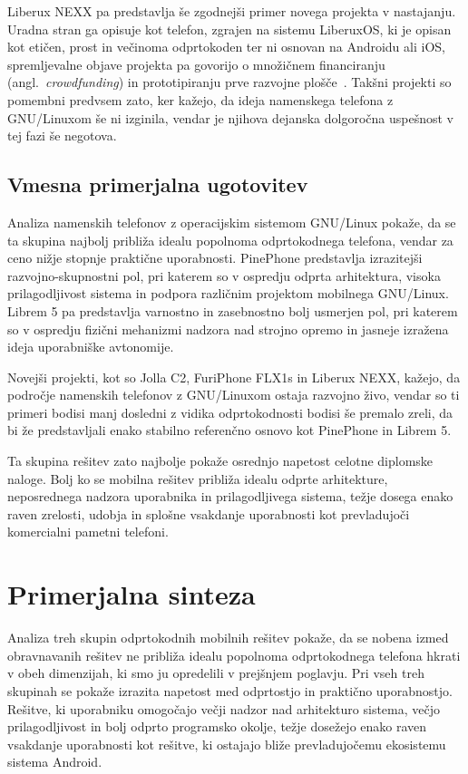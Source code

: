 \documentclass[a4paper,12pt,openright]{book}
\begin{document}
Liberux NEXX pa predstavlja še zgodnejši primer novega projekta v nastajanju.
Uradna stran ga opisuje kot telefon, zgrajen na sistemu LiberuxOS, ki je opisan kot etičen, prost in večinoma odprtokoden ter ni osnovan na Androidu ali iOS, spremljevalne objave projekta pa govorijo o množičnem financiranju (angl.~\textit{crowdfunding}) in prototipiranju prve razvojne plošče~\cite{liberux_home,liberux_crowdfunding,liberux_devboard}.
Takšni projekti so pomembni predvsem zato, ker kažejo, da ideja namenskega telefona z GNU/Linuxom še ni izginila, vendar je njihova dejanska dolgoročna uspešnost v tej fazi še negotova.

\subsection{Vmesna primerjalna ugotovitev}

Analiza namenskih telefonov z operacijskim sistemom GNU/Linux pokaže, da se ta skupina najbolj približa idealu popolnoma odprtokodnega telefona, vendar za ceno nižje stopnje praktične uporabnosti.
PinePhone predstavlja izrazitejši razvojno-skupnostni pol, pri katerem so v ospredju odprta arhitektura, visoka prilagodljivost sistema in podpora različnim projektom mobilnega GNU/Linux.
Librem 5 pa predstavlja varnostno in zasebnostno bolj usmerjen pol, pri katerem so v ospredju fizični mehanizmi nadzora nad strojno opremo in jasneje izražena ideja uporabniške avtonomije.

Novejši projekti, kot so Jolla C2, FuriPhone FLX1s in Liberux NEXX, kažejo, da področje namenskih telefonov z GNU/Linuxom ostaja razvojno živo, vendar so ti primeri bodisi manj dosledni z vidika odprtokodnosti bodisi še premalo zreli, da bi že predstavljali enako stabilno referenčno osnovo kot PinePhone in Librem 5.

Ta skupina rešitev zato najbolje pokaže osrednjo napetost celotne diplomske naloge.
Bolj ko se mobilna rešitev približa idealu odprte arhitekture, neposrednega nadzora uporabnika in prilagodljivega sistema, težje dosega enako raven zrelosti, udobja in splošne vsakdanje uporabnosti kot prevladujoči komercialni pametni telefoni.

\section{Primerjalna sinteza}
\label{sec:primerjalna_sinteza}

Analiza treh skupin odprtokodnih mobilnih rešitev pokaže, da se nobena izmed obravnavanih rešitev ne približa idealu popolnoma odprtokodnega telefona hkrati v obeh dimenzijah, ki smo ju opredelili v prejšnjem poglavju.
Pri vseh treh skupinah se pokaže izrazita napetost med odprtostjo in praktično uporabnostjo.
Rešitve, ki uporabniku omogočajo večji nadzor nad arhitekturo sistema, večjo prilagodljivost in bolj odprto programsko okolje, težje dosežejo enako raven vsakdanje uporabnosti kot rešitve, ki ostajajo bliže prevladujočemu ekosistemu sistema Android.
\end{document}

